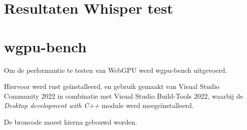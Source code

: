 \section*{Resultaten Whisper test}

\section{wgpu-bench}

Om de performantie te testen van WebGPU werd wgpu-bench uitgevoerd.

Hiervoor werd rust geïnstalleerd, en gebruik gemaakt van Visual Studio Community 2022 in combinatie met Visual Studio Build-Tools 2022, waarbij de \textit{Desktop development with C++} module werd meegeïnstalleerd.

De broncode moest hierna gebouwd worden.


\break{}
